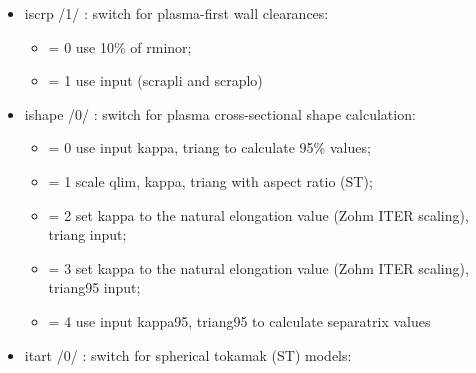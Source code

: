 \documentclass[]{article}
\providecommand{\tightlist}{%
  \setlength{\itemsep}{0pt}\setlength{\parskip}{0pt}}
\begin{document}
\begin{itemize}
\begin{itemize}
    (33) IPB98(y,1) (H-mode)
  \item
    (34) IPB98(y,2) (H-mode)
  \item
    (35) IPB98(y,3) (H-mode)
  \item
    (36) IPB98(y,4) (H-mode)
  \item
    (37) ISS95 (stellarator)
  \item
    (38) ISS04 (stellarator)
  \item
    (39) DS03 (H-mode)
  \item
    (40) Murari et al non-power law (H-mode)
  \item
    (41) Petty 2008 (H-mode)
  \item
    (42) Lang et al. 2012 (H-mode)
  \item
    (43) Hubbard 2017 (I-mode) - nominal
  \item
    (44) Hubbard 2017 (I-mode) - lower bound
  \item
    (45) Hubbard 2017 (I-mode) - upper bound
  \item
    (46) NSTX (H-mode; Spherical tokamak)
  \end{itemize}
\item
  iscrp /1/ : switch for plasma-first wall clearances:

  \begin{itemize}
  \tightlist
  \item
    = 0 use 10\% of rminor;
  \item
    = 1 use input (scrapli and scraplo)
  \end{itemize}
\item
  ishape /0/ : switch for plasma cross-sectional shape calculation:

  \begin{itemize}
  \tightlist
  \item
    = 0 use input kappa, triang to calculate 95\% values;
  \item
    = 1 scale qlim, kappa, triang with aspect ratio (ST);
  \item
    = 2 set kappa to the natural elongation value (Zohm ITER scaling),
    triang input;
  \item
    = 3 set kappa to the natural elongation value (Zohm ITER scaling),
    triang95 input;
  \item
    = 4 use input kappa95, triang95 to calculate separatrix values
  \end{itemize}
\item
  itart /0/ : switch for spherical tokamak (ST) models:


\end{itemize}
\end{document}
